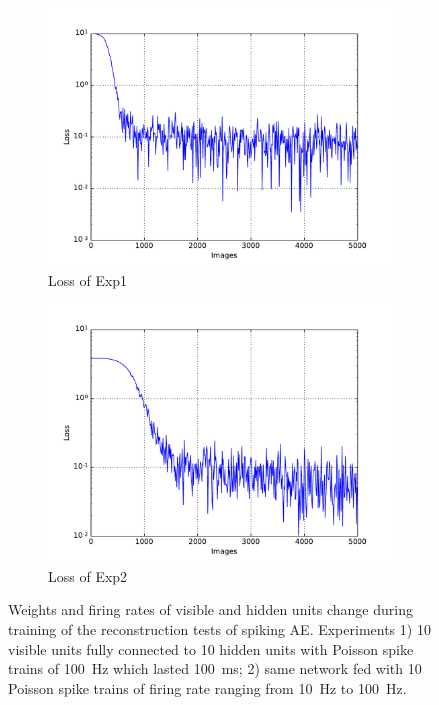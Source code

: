 \begin{figure}
\begin{subfigure}[t]{0.4\textwidth}
		\includegraphics[width=\textwidth]{pics_sdlm/00_exp_SAE_Orig/exp1_mse_nons.pdf}
		\caption{Loss of Exp1}
	\end{subfigure}
	\begin{subfigure}[t]{0.4\textwidth}
		\includegraphics[width=\textwidth]{pics_sdlm/00_exp_SAE_Orig/exp2_mse_nons.pdf}
		\caption{Loss of Exp2}
	\end{subfigure}
	\caption{Weights and firing rates of visible and hidden units change during training of the reconstruction tests of spiking AE. 
		Experiments 1) 10 visible units fully connected to 10 hidden units with Poisson spike trains of 100~Hz which lasted 100~ms; 2) same network fed with 10 Poisson spike trains of firing rate ranging from 10~Hz to 100~Hz.}
\end{figure}

